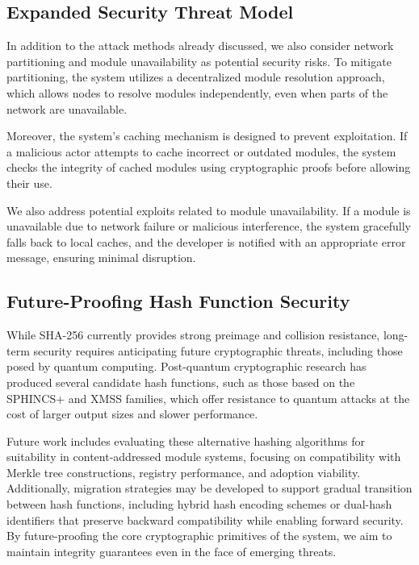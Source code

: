\documentclass[sigplan,screen]{acmart}
\begin{document}
\subsection{Expanded Security Threat Model}

In addition to the attack methods already discussed, we also consider network partitioning and module unavailability as potential security risks. To mitigate partitioning, the system utilizes a decentralized module resolution approach, which allows nodes to resolve modules independently, even when parts of the network are unavailable.

Moreover, the system's caching mechanism is designed to prevent exploitation. If a malicious actor attempts to cache incorrect or outdated modules, the system checks the integrity of cached modules using cryptographic proofs before allowing their use.

We also address potential exploits related to module unavailability. If a module is unavailable due to network failure or malicious interference, the system gracefully falls back to local caches, and the developer is notified with an appropriate error message, ensuring minimal disruption.

\subsection{Future-Proofing Hash Function Security}
\label{sec:security-future}

While SHA-256 currently provides strong preimage and collision resistance, long-term security requires anticipating future cryptographic threats, including those posed by quantum computing. Post-quantum cryptographic research has produced several candidate hash functions, such as those based on the SPHINCS+ and XMSS families, which offer resistance to quantum attacks at the cost of larger output sizes and slower performance.

Future work includes evaluating these alternative hashing algorithms for suitability in content-addressed module systems, focusing on compatibility with Merkle tree constructions, registry performance, and adoption viability. Additionally, migration strategies may be developed to support gradual transition between hash functions, including hybrid hash encoding schemes or dual-hash identifiers that preserve backward compatibility while enabling forward security. By future-proofing the core cryptographic primitives of the system, we aim to maintain integrity guarantees even in the face of emerging threats.
\end{document}
